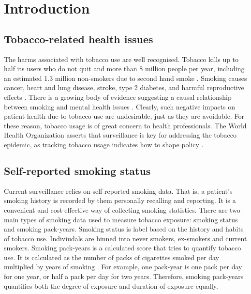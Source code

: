 \documentclass{article}
\begin{document}
\listoffigures
\listofequations
\listoftables

\newpage
{}

\section{Introduction}
\subsection{Tobacco-related health issues}
The harms associated with tobacco use are well recognised. Tobacco kills up to half its users who do not quit and more than 8 million people per year, including an estimated 1.3 million non-smokers due to second hand smoke \cite{who_tobacco}. Smoking causes cancer, heart and lung disease, stroke, type 2 diabetes, and harmful reproductive effects \cite{hhs_smoking_2014}. There is a growing body of evidence suggesting a causal relationship between smoking and mental health issues \cite{taylor2019smoking}. Clearly, such negative impacts on patient health due to tobacco use are undesirable, just as they are avoidable. For these reason, tobacco usage is of great concern to health professionals. The World Health Organization asserts that surveillance is key for addressing the tobacco epidemic, as tracking tobacco usage indicates how to shape policy \cite{who_tobacco}.

\subsection{Self-reported smoking status}
Current surveillance relies on self-reported smoking data. That is, a patient's smoking history is recorded by them personally recalling and reporting. It is a convenient and cost-effective way of collecting smoking statistics. There are two main types of smoking data used to measure tobacco exposure: smoking status and smoking pack-years. Smoking status is label based on the history and habits of tobacco use. Indiviudals are binned into never smokers, ex-smokers and current smokers. Smoking pack-years is a calculated score that tries to quantify tobacco use. It is calculated as the number of packs of cigarettes smoked per day multiplied by years of smoking \cite{smokingpackyears}. For example, one pack-year is one pack per day for one year, or half a pack per day for two years. Therefore, smoking pack-years quantifies both the degree of exposure and duration of exposure equally.
\end{document}
